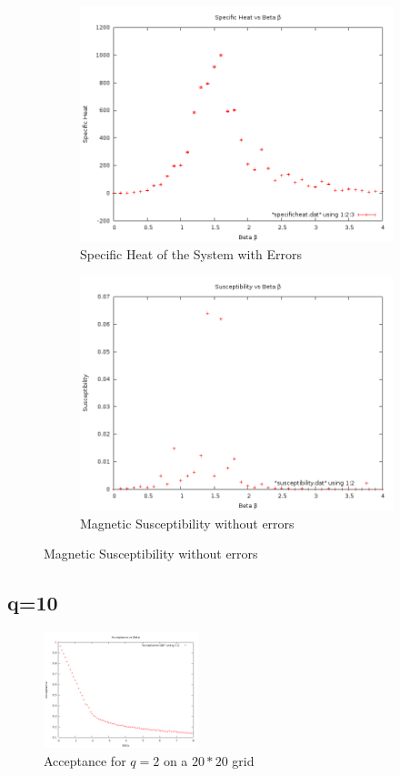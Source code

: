 \documentclass[12pt,a4paper,notitlepage,twoside]{article}
\begin{document}
\begin{figure}[H]
\centering
	\begin{subfigure}[b]{0.45\textwidth}
		\includegraphics[width=\textwidth]{q4d20/specificheat.png}	
		\caption{Specific Heat of the System with Errors}
	\end{subfigure}
	\begin{subfigure}[b]{0.45\textwidth}
		\includegraphics[width=\textwidth]{q4d20/susceptibility.png}
		\caption{Magnetic Susceptibility without errors}
	\end{subfigure}
\end{figure}

\subsection{q=10}
\begin{figure}[H]
\centering
\includegraphics[width=0.4\textwidth]{q10d20/acceptance.png}
\caption{Acceptance for $q=2$ on a $20*20$ grid}
\end{figure}
\end{document}
